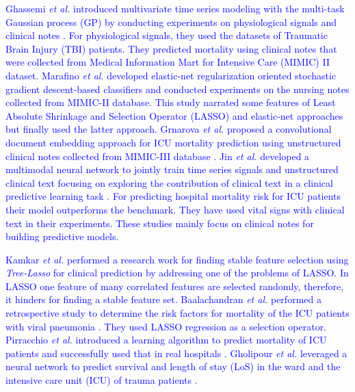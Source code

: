 \textcolor{blue}{Ghassemi \textit{et al.} introduced multivariate time series modeling with the multi-task Gaussian process (GP) by conducting experiments on physiological signals and clinical notes \cite{Ghassemi2015}. For physiological signals, they used the datasets of Traumatic Brain Injury (TBI) patients. They predicted mortality using clinical notes that were collected from Medical Information Mart for Intensive Care (MIMIC) II dataset. Marafino \textit{et al.} developed elastic-net regularization oriented stochastic gradient descent-based classifiers \cite{Marafino2015} and conducted experiments on the nursing notes collected from MIMIC-II database. This study narrated some features of Least Absolute Shrinkage and Selection Operator (LASSO) and elastic-net approaches but finally used the latter approach. Grnarova \textit{et al.} proposed a convolutional document embedding approach for ICU mortality prediction using unstructured clinical notes collected from MIMIC-III database \cite{Grnarova2016}. Jin \textit{et al.} developed a multimodal neural network to jointly train time series signals and unstructured clinical text focusing on exploring the contribution of clinical text in a clinical predictive learning task \cite{Jin2018}. For predicting hospital mortality risk for ICU patients their model outperforms the benchmark. They have used vital signs with clinical text in their experiments. These studies mainly focus on clinical notes for building predictive models}.  

\textcolor{blue}{Kamkar \textit{et al.} performed a research work for finding stable feature selection using \textit{Tree-Lasso} for clinical prediction \cite{Kamkar2015} by addressing one of the problems of LASSO. In LASSO one feature of many correlated features are selected randomly, therefore, it hinders for finding a stable feature set. Baalachandran \textit{et al.} performed a retrospective study to determine the risk factors for mortality of the ICU patients with viral pneumonia \cite{Baalachandran2015}. They used LASSO regression as a selection operator. Pirracchio \textit{et al.} introduced a learning algorithm to predict mortality of ICU patients and successfully used that in real hospitals \cite{Pirracchio2015}. Gholipour \textit{et al.} leveraged a neural network to predict survival and length of stay (LoS) in the ward and the intensive care unit (ICU) of trauma patients \cite{Gholipour2015}.}  

